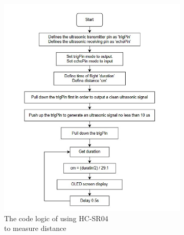 \begin{landscape}
    \begin{figure}[H] %
        \centering 
        \captionsetup{labelsep=colon}
        \begin{subfigure}{0.715\textwidth} %
            \centering
            \includegraphics[width=\linewidth]{Image/Design/code_logic_tof.jpg}
            \caption{\centering The code logic of using HC-SR04 \\to measure distance}
            \label{fig:cl_tof}
        \end{subfigure}
        \begin{subfigure}{0.52\textwidth} %
            \centering

\end{subfigure}
\end{figure}
\end{landscape}
